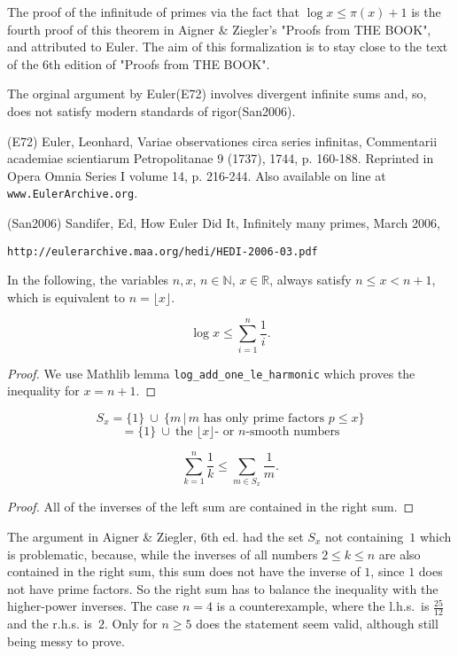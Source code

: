 The proof of the infinitude of primes via the fact that $\log x\le \pi(x)+1$ is the fourth proof of this theorem in Aigner \& Ziegler's "Proofs from THE BOOK", and attributed to Euler. The aim of this formalization is to stay close to the text of the 6th edition of "Proofs from THE BOOK".

The orginal argument by Euler(E72) involves divergent infinite sums and, so, does not satisfy
modern standards of rigor(San2006).

(E72)
Euler, Leonhard, Variae observationes circa series infinitas, Commentarii academiae scientiarum
Petropolitanae 9 (1737), 1744, p. 160-188. Reprinted in Opera Omnia Series I volume 14, p. 216-244.
Also available on line at \verb|www.EulerArchive.org|. 

(San2006)
Sandifer, Ed, How Euler Did It, Infinitely many primes, March 2006, \begin{verbatim}http://eulerarchive.maa.org/hedi/HEDI-2006-03.pdf\end{verbatim}

\begin{definition}
\label{def:nx}
In the following, the variables $n,x$, $n\in\mathbb{N}$, $x\in\mathbb{R}$, always satisfy
$n\le x < n+1$, which is equivalent to $n=\lfloor x\rfloor$. 
\end{definition}

\begin{lemma}
\label{lem:lemma0}
\leanok
$$\log x \le \sum_{i=1}^n\frac1i.$$
\end{lemma}
\begin{proof}
\leanok
    We use Mathlib lemma \verb|log_add_one_le_harmonic| which proves the inequality for $x=n+1$. 
\end{proof}

\begin{definition}
\label{def:S}
\leanok
    $$ S_x = \{1\}\ \cup\ \{m\,\big|\, \text{$m$ has only prime factors $p\le x$}\} $$
    $$ = \{1\}\ \cup\ \text{the $\lfloor x\rfloor$- or $n$-smooth numbers} $$
\end{definition}

\begin{lemma}
\label{lem:lemma1}
\leanok
    $$\sum_{k=1}^n\frac1k \le \sum_{m\in S_x}\frac{1}{m}. $$
\end{lemma}
\begin{proof}
All of the inverses of the left sum are contained in the right sum.
\end{proof}
The argument in Aigner \& Ziegler, 6th ed. had the set $S_x$ not containing~$1$ which
is problematic, because, while the inverses of all numbers $2\le k \le n$ are also contained
in the right sum, this sum does not have the inverse of $1$, since $1$ does not have prime factors.
So the right
sum has to balance the inequality with the higher-power inverses. The case $n=4$ is a counterexample,
where the l.h.s.~is $\tfrac{25}{12}$ and the r.h.s. is~$2$. Only for $n\ge5$ does the statement seem valid,
although still being messy to prove.


